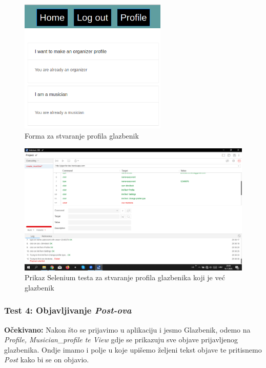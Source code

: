 		\begin{figure}[H]
			\begin{center}
				\includegraphics[width=7cm]{slike/crmus.PNG}
			\end{center}
			\caption{Forma za stvaranje profila glazbenik}
			\label{fig:crm}
		\end{figure}
	
		\begin{figure}[H]
			\begin{center}
				\includegraphics[width=15cm]{slike/selenium_createmus.PNG}
			\end{center}
			\caption{Prikaz Selenium testa za stvaranje profila glazbenika koji je već glazbenik}
			\label{fig:crmus2}
		\end{figure}
		
		
		\subsubsection{Test 4: Objavljivanje \textit{Post-ova}}
			\textbf{Očekivano:} Nakon što se prijavimo u aplikaciju i jesmo Glazbenik, odemo na \textit{Profile, Musician\_profile te View} gdje se prikazuju sve objave prijavljenog glazbenika. Ondje imamo i polje u koje upišemo željeni tekst objave te pritisnemo \textit{Post} kako bi se on objavio.
			
